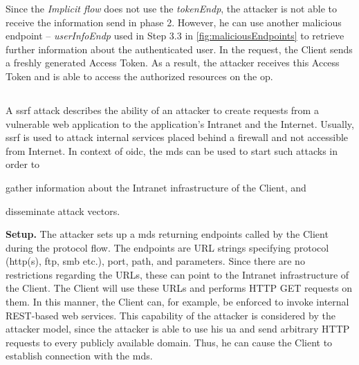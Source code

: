 \documentclass[conference,compsoc]{IEEEtran}
\renewcommand*{\paragraph}[1]{\vspace{2mm}\noindent\textbf{#1.}}
\begin{document}
Since the \emph{Implicit flow} does not use the \emph{tokenEndp}, the attacker is not able to receive the information send in phase 2. However, he can use another malicious endpoint -- \emph{userInfoEndp} used in Step 3.3 in \autoref{fig:maliciousEndpoints} to retrieve further information about the authenticated user. In the request, the Client sends a freshly generated Access Token. As a result, the attacker receives this Access Token and is able to access the authorized resources on the \gls{op}.




\subsection{}
\label{sec:ssrfOIDC}
A \gls{ssrf} attack describes the ability of an attacker to create requests from a vulnerable web application to the application's Intranet and the Internet. Usually, \gls{ssrf} is used to attack internal services placed behind a firewall and not accessible from Internet.
In context of \gls{oidc}, the \gls{mds} can be used to start such attacks in order to 
\begin{inparaenum}
    \item gather information about the Intranet infrastructure of the Client, and 
    \item disseminate attack vectors.
\end{inparaenum}

\paragraph{Setup}
The attacker sets up a \gls{mds} returning endpoints called by the Client during the protocol flow. The endpoints are URL strings specifying protocol (http(s), ftp, smb etc.), port, path, and parameters.
Since there are no restrictions regarding the URLs, these can point to the Intranet infrastructure of the Client.
The Client will use these URLs and performs HTTP GET requests on them.
In this manner, the Client can, for example, be enforced to invoke internal REST-based web services.
This capability of the attacker is considered by the attacker model, since the attacker is able to use his \gls{ua} and send arbitrary HTTP requests to every publicly available domain. 
Thus, he can cause the Client to establish connection with the \gls{mds}.
\end{document}
